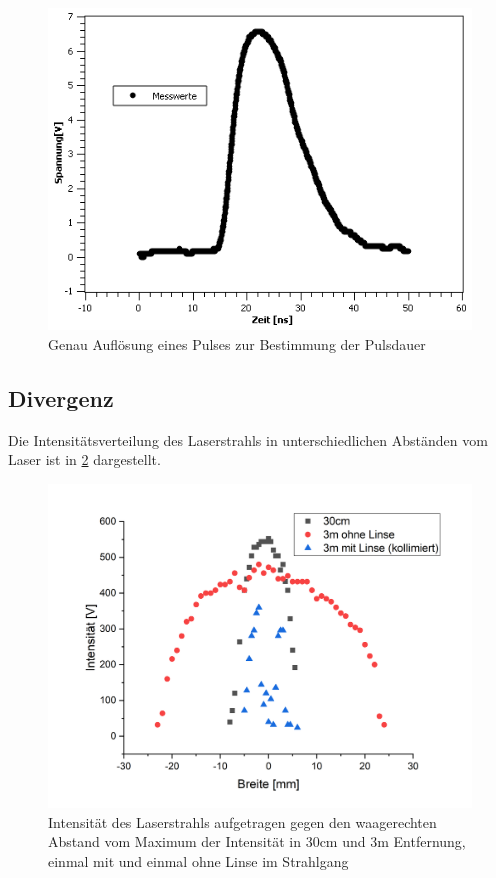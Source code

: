 \documentclass[
	a4paper,
	12pt,
	pagesize,
	ngerman
]{scrartcl}
\begin{document}
\begin{figure}[h!]
	\centering
	\includegraphics[scale=0.7]{Pulsdauer.png}
	\caption{Genau Auflösung eines Pulses zur Bestimmung der Pulsdauer}
	\label{Pulsdauer}
\end{figure}

\subsection{Divergenz}
Die Intensitätsverteilung des Laserstrahls in unterschiedlichen Abständen vom Laser ist in \cref{breite} dargestellt.

\begin{figure}[h!]
	\centering
	\includegraphics[scale=0.7]{breite.png}
	\caption{Intensität des Laserstrahls aufgetragen gegen den waagerechten Abstand vom Maximum der Intensität in 30cm und 3m Entfernung, einmal mit und einmal ohne Linse im Strahlgang}
	\label{breite}
\end{figure}
\end{document}
